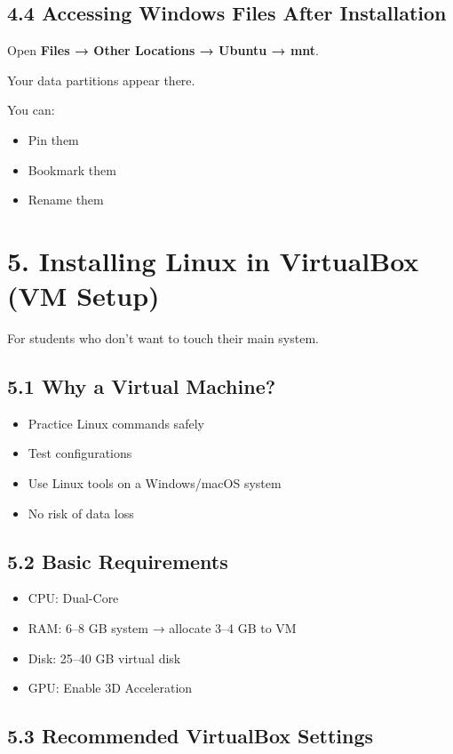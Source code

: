 \documentclass[12pt]{article}
\begin{document}
\subsection*{4.4 Accessing Windows Files After Installation}

Open \textbf{Files → Other Locations → Ubuntu → mnt}.

Your data partitions appear there.

You can:

\begin{itemize}
    \item Pin them
    \item Bookmark them
    \item Rename them
\end{itemize}

\section*{5. Installing Linux in VirtualBox (VM Setup)}

For students who don't want to touch their main system.

\subsection*{5.1 Why a Virtual Machine?}

\begin{itemize}
    \item Practice Linux commands safely
    \item Test configurations
    \item Use Linux tools on a Windows/macOS system
    \item No risk of data loss
\end{itemize}

\subsection*{5.2 Basic Requirements}

\begin{itemize}
    \item CPU: Dual-Core
    \item RAM: 6–8 GB system → allocate 3–4 GB to VM
    \item Disk: 25–40 GB virtual disk
    \item GPU: Enable 3D Acceleration
\end{itemize}

\subsection*{5.3 Recommended VirtualBox Settings}
\end{document}
